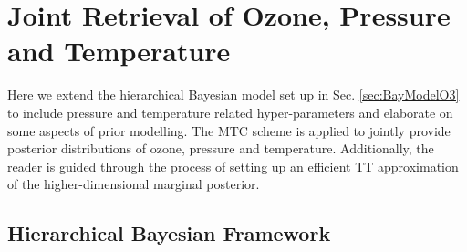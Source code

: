 \chapter{Joint Retrieval of Ozone, Pressure and Temperature}
\label{ch:FullBay}

Here we extend the hierarchical Bayesian model set up in Sec. \ref{sec:BayModelO3} to include pressure and temperature related hyper-parameters and elaborate on some aspects of prior modelling.
The MTC scheme is applied to jointly provide posterior distributions of ozone, pressure and temperature.
Additionally, the reader is guided through the process of setting up an efficient TT approximation of the higher-dimensional marginal posterior.



\section{Hierarchical Bayesian Framework}
\label{sec:FullHierarch}
